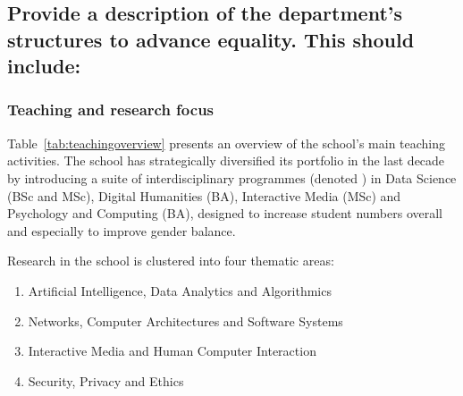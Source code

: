 \subsection{Provide a description of the department’s structures to advance equality. This should include:}  

\subsubsection{Teaching and research focus}



Table~\ref{tab:teachingoverview} presents an overview of the school's
main teaching activities. 
The school has strategically diversified its portfolio in the
last decade by introducing a suite of interdisciplinary programmes
(denoted \interdis)
in Data Science (BSc and MSc), Digital Humanities (BA), Interactive 
Media (MSc) and Psychology and Computing (BA), designed to increase 
student  numbers overall and  especially to improve gender balance. 






Research in the school is clustered into four thematic areas:
\begin{enumerate}[noitemsep]
    \item Artificial Intelligence, Data Analytics and Algorithmics
    \item Networks, Computer Architectures and Software Systems 
    \item Interactive Media and Human Computer Interaction
    \item Security, Privacy and Ethics
\end{enumerate}


